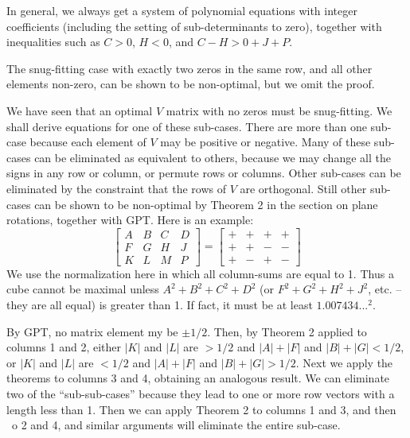 In general, we always get a system of polynomial equations with
integer coefficients (including the setting of sub-determinants to zero),
together with inequalities such as $C > 0$, $H < 0$, and $C - H > 0 + J + P$.

The snug-fitting case with exactly two zeros in the same row, and
\label{refpage21}
all other elements non-zero, can be shown to be non-optimal, but we omit
the proof.

We have seen that an optimal $V$ matrix with no zeros must be snug-fitting.
\label{refpage2start}
We shall derive equations for one of these sub-cases. There are
more than one sub-case because each element of $V$ may be positive or
negative. Many of these sub-cases can be eliminated as equivalent to
others, because we may change all the signs in any row or column, or
permute rows or columns. Other sub-cases can be eliminated by the
constraint that the rows of $V$ are orthogonal. Still other sub-cases can be
shown to be non-optimal by Theorem 2 in the section on plane rotations,
together with GPT. Here is an example:
\begin{equation*}
\begin{bmatrix}
A & B & C & D \\
F & G & H & J \\
K & L & M & P
\end{bmatrix}
=
\begin{bmatrix}
+ & + & + & + \\
+ & + & - & - \\
+ & - & + & -
\end{bmatrix}
\end{equation*}
We use the normalization here in which all column-sums are equal to 1.  Thus a
cube cannot be maximal unless $A^2 + B^2 + C^2 + D^2$ (or $F^2 + G^2 + H^2 +
J^2$, etc. -- they are all equal) is greater than 1.  If fact, it must be at
least $1.007434...^2$.

By GPT, no matrix element my be $\pm 1/2$.  Then, by Theorem 2 applied to
\label{refpage1start}
columns 1 and 2, either $|K|$ and $|L|$ are $> 1/2$ and $|A| + |F|$ and $|B| +
|G| < 1/2$, or $|K|$ and $|L|$ are $< 1/2$ and $|A| + |F|$ and $|B| + |G| >
1/2$.  Next we apply the theorems to columns 3 and 4, obtaining an analogous
result.  We can eliminate two of the ``sub-sub-cases'' because they lead to one
or more row vectors with a length less than 1. Then we can apply Theorem 2 to
columns 1 and 3, and then ~o 2 and 4, and similar arguments will eliminate
\label{refpage2end}
the entire sub-case.

